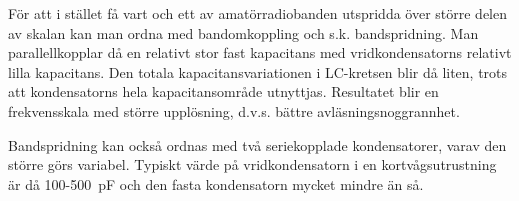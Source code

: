 För att i stället få vart och ett av amatörradiobanden utspridda över
större delen av skalan kan man ordna med bandomkoppling och
s.k. bandspridning. Man parallellkopplar då en relativt stor fast
kapacitans med vridkondensatorns relativt lilla kapacitans. Den totala
kapacitansvariationen i LC-kretsen blir då liten, trots att
kondensatorns hela kapacitansområde utnyttjas. Resultatet blir en
frekvensskala med större upplösning, d.v.s. bättre
avläsningsnoggrannhet.

Bandspridning kan också ordnas med två seriekopplade kondensatorer,
varav den större görs variabel. Typiskt värde på vridkondensatorn i en
kortvågsutrustning är då 100-500~pF och den fasta kondensatorn mycket
mindre än så.
